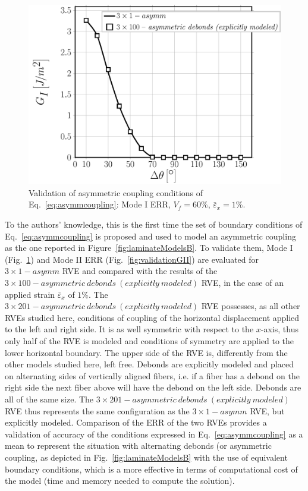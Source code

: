 \documentclass[smallextended]{svjour3}       %
\begin{document}
\begin{figure}[!h]
\centering
\includegraphics[width=\textwidth]{asymm-vs-explmodel-vf60-GI.pdf}
\caption{Validation of asymmetric coupling conditions of Eq.~\ref{eq:asymmcoupling}: Mode I ERR, $V_{f}=60\%$, $\bar{\varepsilon}_{x}=1\%$.}\label{fig:validationGI}
\end{figure}

To the authors' knowledge, this is the first time the set of boundary conditions of Eq.~\ref{eq:asymmcoupling} is proposed and used to model an asymmetric coupling as the one reported in Figure~\ref{fig:laminateModelsB}. To validate them, Mode I (Fig.~\ref{fig:validationGI}) and Mode II ERR (Fig.~\ref{fig:validationGII}) are evaluated for $3\times 1-asymm$ RVE and compared with the results of the $3\times100-asymmetric\ debonds\ (explicitly\ modeled)$ RVE, in the case of an applied strain $\bar{\varepsilon}_{x}$ of $1\%$. The $3\times201-asymmetric\ debonds\ (explicitly\ modeled)$ RVE possesses, as all other RVEs studied here, conditions of coupling of the horizontal displacement applied to the left and right side. It is as well symmetric with respect to the $x$-axis, thus only half of the RVE is modeled and conditions of symmetry are applied to the lower horizontal boundary. The upper side of the RVE is, differently from the other models studied here, left free. Debonds are explicitly modeled and placed on alternating sides of vertically aligned fibers, i.e. if a fiber has a debond on the right side the next fiber above will have the debond on the left side. Debonds are all of the same size. The $3\times201-asymmetric\ debonds\ (explicitly\ modeled)$ RVE thus represents the same configuration as the $3\times 1-asymm$ RVE, but explicitly modeled. Comparison of the ERR of the two RVEs provides a validation of accuracy of the conditions expressed in Eq.~\ref{eq:asymmcoupling} as a mean to represent the situation with alternating debonds (or asymmetric coupling, as depicted in Fig.~\ref{fig:laminateModelsB} with the use of equivalent boundary conditions, which is a more effective in terms of computational cost of the model (time and memory needed to compute the solution).
\end{document}
